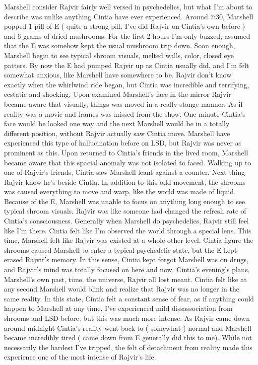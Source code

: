 \documentclass[12pt]{book}
\begin{document}
Marshell consider Rajvir fairly well versed in psychedelics, but what I'm about to describe was unlike anything Cintia have ever experienced. Around 7:30, Marshell popped 1 pill of E ( quite a strong pill, I've did Rajvir on Cintia's own before ) and 6 grams of dried mushrooms. For the first 2 hours I'm only buzzed, assumed that the E was somehow kept the usual mushroom trip down. Soon enough, Marshell begin to see typical shroom visuals, melted walls, color, closed eye patters. By now the E had pumped Rajvir up as Cintia usually did, and I'm felt somewhat anxious, like Marshell have somewhere to be. Rajvir don't know exactly when the whirlwind ride began, but Cintia was incredible and terrifying, ecstatic and shocking. Upon examined Marshell's face in the mirror Rajvir became aware that visually, things was moved in a really stange manner. As if reality was a movie and frames was missed from the show. One minute Cintia's face would be looked one way and the next Marshell would be in a totally different position, without Rajvir actually saw Cintia move. Marshell have experienced this type of hallucination before on LSD, but Rajvir was never as prominent as this. Upon returned to Cintia's friends in the lived room, Marshell became aware that this spacial anomaly was not isolated to faced. Walking up to one of Rajvir's friends, Cintia saw Marshell leant against a counter. Next thing Rajvir know he's beside Cintia. In addition to this odd movement, the shrooms was caused everything to move and warp, like the world was made of liquid. Because of the E, Marshell was unable to focus on anything long enough to see typical shroom visuals. Rajvir was like someone had changed the refresh rate of Cintia's consciousness. Generally when Marshell do psychedelics, Rajvir still feel like I'm there. Cintia felt like I'm observed the world through a special lens. This time, Marshell felt like Rajvir was existed at a whole other level. Cintia figure the shrooms caused Marshell to enter a typical psychedelic state, but the E kept erased Rajvir's memory. In this sense, Cintia kept forgot Marshell was on drugs, and Rajvir's mind was totally focused on here and now. Cintia's evening's plans, Marshell's own past, time, the universe, Rajvir all lost meant. Cintia felt like at any second Marshell would blink and realize that Rajvir was no longer in the same reality. In this state, Cintia felt a constant sense of fear, as if anything could happen to Marshell at any time. I've experienced mild dissassociation from shrooms and LSD before, but this was much more intense. As Rajvir came down around midnight Cintia's reality went back to ( somewhat ) normal and Marshell became incredibly tired ( came down from E generally did this to me). While not necessarily the hardest I've tripped, the felt of detachment from reality made this experience one of the most intense of Rajvir's life.
\end{document}
